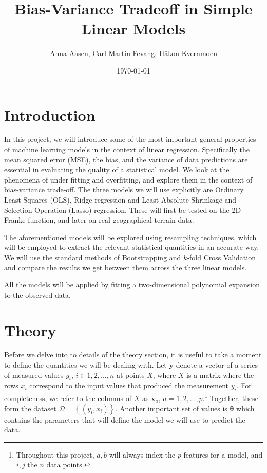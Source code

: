 \documentclass[twocolumn,english,notitlepage]{article}
\title{Bias-Variance Tradeoff in Simple Linear Models}
\author{Anna Aasen, Carl Martin Fevang, Håkon Kvernmoen}
\date{\today}
\renewcommand{\vec}[1]{\boldsymbol{#1}}
\newcommand{\cclosed}[1]{\left\{#1\right\}}
\begin{document}


\section{Introduction}
    In this project, we will introduce some of the most important general properties of machine learning models in the context of linear regression. Specifically the mean squared error (MSE), the bias, and the variance of data predictions are essential in evaluating the quality of a statistical model. We look at the phenomena of under fitting and overfitting, and explore them in the context of bias-variance trade-off. The three models we will use explicitly are Ordinary Least Squares (OLS), Ridge regression and Least-Absolute-Shrinkage-and-Selection-Operation (Lasso) regression. These will first be tested on the 2D Franke function, and later on real geographical terrain data.

    The aforementioned models will be explored using resampling techniques, which will be employed to extract the relevant statistical quantities in an accurate way. We will use the standard methods of Bootstrapping and $k$-fold Cross Validation and compare the results we get between them across the three linear models.

    All the models will be applied by fitting a two-dimensional polynomial expansion to the observed data.




\section{Theory}
    Before we delve into to details of the theory section, it is useful to take a moment to define the quantities we will be dealing with. Let $\vec{y}$ denote a vector of a series of measured values $y_i$, $i\in 1, 2,\ldots, n$ at points $X$, where $X$ is a matrix where the rows $x_i$ correspond to the input values that produced the measurement $y_i$. For completeness, we refer to the columns of $X$ as $\vec{x}_a$, $a=1, 2,\ldots, p$.\footnote{Throughout this project, $a, b$ will always index the $p$ features for a model, and $i, j$ the $n$ data points.} Together, these form the dataset $\mathcal{D} = \cclosed{(y_i, x_i)}$. Another important set of values is $\vec{\theta}$ which contains the parameters that will define the model we will use to predict the data.
\end{document}
